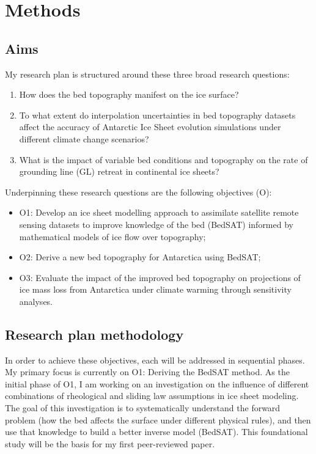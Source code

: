 \chapter{Methods}
\section{Aims}
 My research plan is structured around these three broad research questions:
\begin{enumerate}

    \item How does the bed topography manifest on the ice surface?

    \item To what extent do interpolation uncertainties in bed topography datasets affect the accuracy of Antarctic Ice Sheet evolution simulations under different climate change scenarios?

    \item What is the impact of variable bed conditions and topography on the rate of grounding line (GL) retreat in continental ice sheets?

\end{enumerate}

Underpinning these research questions are the following objectives (O):
\begin{itemize}
    \item{O1:} Develop an ice sheet modelling approach to assimilate satellite remote sensing datasets to improve knowledge of the bed (BedSAT) informed by mathematical models of ice flow over topography;

    \item{O2:} Derive a new bed topography for Antarctica using BedSAT;

    \item{O3:} Evaluate the impact of the improved bed topography on projections of ice mass loss from Antarctica under climate warming through sensitivity analyses. 
\end{itemize}

\section{Research plan methodology}

In order to achieve these objectives, each will be addressed in sequential phases. My primary focus is currently on O1: Deriving the BedSAT method. As the initial phase of O1, I am working on an investigation on the influence of different combinations of rheological and sliding law assumptions in ice sheet modeling. The goal of this investigation is to systematically understand the forward problem (how the bed affects the surface under different physical rules), and then use that knowledge to build a better inverse model (BedSAT). This foundational study will be the basis for my first peer-reviewed paper.

